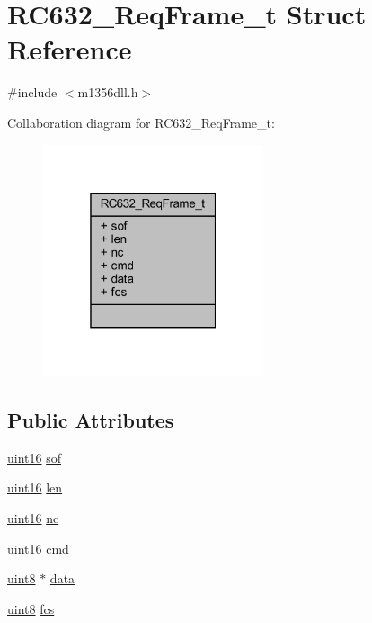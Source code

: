 \hypertarget{struct_r_c632___req_frame__t}{}\section{R\+C632\+\_\+\+Req\+Frame\+\_\+t Struct Reference}
\label{struct_r_c632___req_frame__t}


{\ttfamily \#include $<$m1356dll.\+h$>$}



Collaboration diagram for R\+C632\+\_\+\+Req\+Frame\+\_\+t\+:
\nopagebreak
\begin{figure}[H]
\begin{center}
\leavevmode
\includegraphics[width=184pt]{struct_r_c632___req_frame__t__coll__graph}
\end{center}
\end{figure}
\subsection*{Public Attributes}
\begin{DoxyCompactItemize}
\item 
\mbox{\hyperlink{m1356dll_8h_a05f6b0ae8f6a6e135b0e290c25fe0e4e}{uint16}} \mbox{\hyperlink{struct_r_c632___req_frame__t_a737aa31dee20b759864099b808dbe156}{sof}}
\item 
\mbox{\hyperlink{m1356dll_8h_a05f6b0ae8f6a6e135b0e290c25fe0e4e}{uint16}} \mbox{\hyperlink{struct_r_c632___req_frame__t_a149ca47be10f9f2f248562e195e815de}{len}}
\item 
\mbox{\hyperlink{m1356dll_8h_a05f6b0ae8f6a6e135b0e290c25fe0e4e}{uint16}} \mbox{\hyperlink{struct_r_c632___req_frame__t_a09ca61a8ee262ee7c98669cd3226510b}{nc}}
\item 
\mbox{\hyperlink{m1356dll_8h_a05f6b0ae8f6a6e135b0e290c25fe0e4e}{uint16}} \mbox{\hyperlink{struct_r_c632___req_frame__t_a68d25a2924669c1db2505dfbd6fcb78c}{cmd}}
\item 
\mbox{\hyperlink{m1356dll_8h_adde6aaee8457bee49c2a92621fe22b79}{uint8}} $\ast$ \mbox{\hyperlink{struct_r_c632___req_frame__t_a4a00ab754d5f558d2ad59f6550159638}{data}}
\item 
\mbox{\hyperlink{m1356dll_8h_adde6aaee8457bee49c2a92621fe22b79}{uint8}} \mbox{\hyperlink{struct_r_c632___req_frame__t_a632b8737a5db3c9a947699c40345e165}{fcs}}
\end{DoxyCompactItemize}


